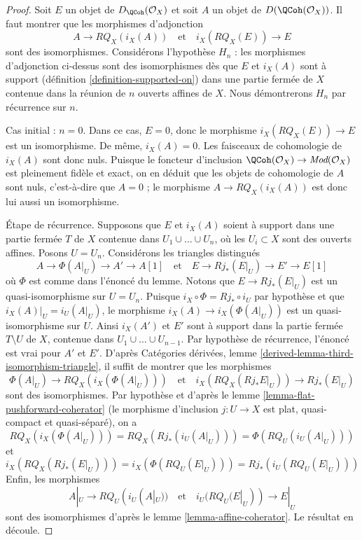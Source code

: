 \begin{proof}
Soit $E$ un objet de $D_\QCoh(\mathcal{O}_X)$ et
soit $A$ un objet de $D(\QCoh(\mathcal{O}_X))$.
Il faut montrer que les morphismes d'adjonction
$$
A \to RQ_X(i_X(A))
\quad\text{et}\quad
i_X(RQ_X(E)) \to E
$$
sont des isomorphismes. Considérons l'hypothèse
$H_n$ : les morphismes d'adjonction ci-dessus sont des isomorphismes
dès que $E$ et $i_X(A)$ sont à support
(définition \ref{definition-supported-on})
dans une partie fermée de $X$
contenue dans la réunion de $n$ ouverts affines de $X$.
Nous démontrerons $H_n$ par récurrence sur $n$.

\medskip\noindent
Cas initial : $n = 0$. Dans ce cas, $E = 0$, donc le morphisme
$i_X(RQ_X(E)) \to E$ est un isomorphisme. De même, $i_X(A) = 0$.
Les faisceaux de cohomologie de $i_X(A)$ sont donc nuls. Puisque le foncteur d'inclusion
$\QCoh(\mathcal{O}_X) \to \textit{Mod}(\mathcal{O}_X)$
est pleinement fidèle et exact, on en déduit que les objets de cohomologie
de $A$ sont nuls, c'est-à-dire que $A = 0$ ; le morphisme
$A \to RQ_X(i_X(A))$ est donc lui aussi un isomorphisme.

\medskip\noindent
Étape de récurrence. Supposons que $E$ et $i_X(A)$ soient à support dans une
partie fermée $T$ de $X$ contenue dans $U_1 \cup \ldots \cup U_n$,
où les $U_i \subset X$ sont des ouverts affines. Posons $U = U_n$.
Considérons les triangles distingués
$$
A \to \Phi(A|_U) \to A' \to A[1]
\quad\text{et}\quad
E \to Rj_*(E|_U) \to E' \to E[1]
$$
où $\Phi$ est comme dans l'énoncé du lemme.
Notons que $E \to Rj_*(E|_U)$ est un quasi-isomorphisme sur $U = U_n$.
Puisque $i_X \circ \Phi = Rj_* \circ i_U$ par hypothèse
et que $i_X(A)|_U = i_U(A|_U)$,
le morphisme $i_X(A) \to i_X(\Phi(A|_U))$ est un quasi-isomorphisme sur $U$.
Ainsi $i_X(A')$ et $E'$ sont à support dans la partie
fermée $T \setminus U$ de $X$, contenue dans
$U_1 \cup \ldots \cup U_{n - 1}$.
Par hypothèse de récurrence, l'énoncé est vrai pour $A'$ et $E'$. D'après
Catégories dérivées, lemme \ref{derived-lemma-third-isomorphism-triangle},
il suffit de montrer que les morphismes
$$
\Phi(A|_U) \to RQ_X(i_X(\Phi(A|_U)))
\quad\text{et}\quad
i_X(RQ_X(Rj_*E|_U)) \to Rj_*(E|_U)
$$
sont des isomorphismes. Par hypothèse et d'après
le lemme \ref{lemma-flat-pushforward-coherator}
(le morphisme d'inclusion $j : U \to X$ est plat, quasi-compact et
quasi-séparé), on a
$$
RQ_X(i_X(\Phi(A|_U))) = RQ_X(Rj_*(i_U(A|_U))) = \Phi(RQ_U(i_U(A|_U)))
$$
et
$$
i_X(RQ_X(Rj_*(E|_U))) = i_X(\Phi(RQ_U(E|_U))) = Rj_*(i_U(RQ_U(E|_U)))
$$
Enfin, les morphismes
$$
A|_U \to RQ_U(i_U(A|_U))
\quad\text{et}\quad
i_U(RQ_U(E|_U)) \to E|_U
$$
sont des isomorphismes d'après le lemme \ref{lemma-affine-coherator}. Le résultat en découle.
\end{proof}

